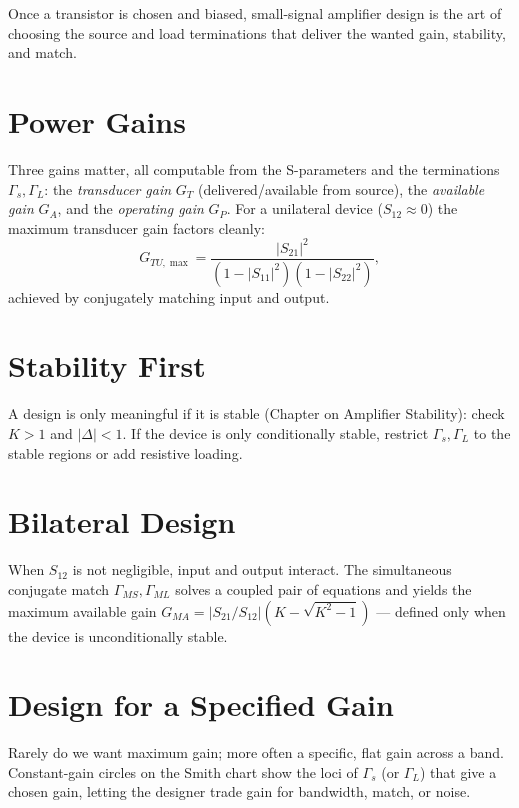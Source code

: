 Once a transistor is chosen and biased, small-signal amplifier design is the art
of choosing the source and load terminations that deliver the wanted gain,
stability, and match.

\section{Power Gains}
Three gains matter, all computable from the S-parameters and the terminations
$\Gamma_s,\Gamma_L$: the \emph{transducer gain} $G_T$ (delivered/available from
source), the \emph{available gain} $G_A$, and the \emph{operating gain} $G_P$.
For a unilateral device ($S_{12}\!\approx\!0$) the maximum transducer gain
factors cleanly:
\[ G_{TU,\max} = \frac{|S_{21}|^2}{(1-|S_{11}|^2)(1-|S_{22}|^2)}, \]
achieved by conjugately matching input and output.

\section{Stability First}
A design is only meaningful if it is stable (Chapter on Amplifier Stability):
check $K>1$ and $|\Delta|<1$. If the device is only conditionally stable, restrict
$\Gamma_s,\Gamma_L$ to the stable regions or add resistive loading.

\section{Bilateral Design}
When $S_{12}$ is not negligible, input and output interact. The simultaneous
conjugate match $\Gamma_{MS},\Gamma_{ML}$ solves a coupled pair of equations and
yields the maximum available gain $G_{MA}=|S_{21}/S_{12}|(K-\sqrt{K^2-1})$ ---
defined only when the device is unconditionally stable.

\section{Design for a Specified Gain}
Rarely do we want maximum gain; more often a specific, flat gain across a band.
Constant-gain circles on the Smith chart show the loci of $\Gamma_s$ (or
$\Gamma_L$) that give a chosen gain, letting the designer trade gain for
bandwidth, match, or noise.
